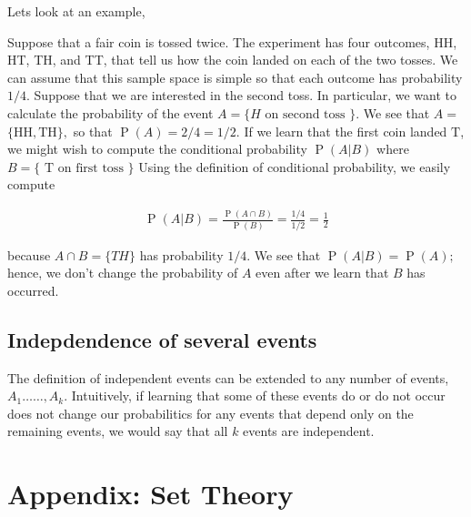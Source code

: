 \documentclass[ 11pt,%
				a4paper,%
				oneside,%
				headinclude,%
				footinclude = true,%
				cleardoublepage = empty,%
				reqno]{scrbook}
\begin{document}
Lets look at an example, 


\begin{example}
	Suppose that a fair coin is tossed twice. The experiment has four outcomes, HH, HT, TH, and TT, that tell us how the coin landed on each of the two tosses. We can assume that this sample space is simple so that each outcome has probability $1 / 4 .$ Suppose that we are interested in the second toss. In particular, we want to calculate the probability of the event $A=\{H \text { on second toss }\}$. We see that $A=$ $\{\mathrm{HH}, \mathrm{TH}\},$ so that $\operatorname{P}(A)=2 / 4=1 / 2 .$ If we learn that the first coin landed $\mathrm{T}$, we might wish to compute the conditional probability $\operatorname{P}(A | B)$ where $B=\{\text { T on first toss }\}$ Using the definition of conditional probability, we easily compute

	\begin{align*}
		\operatorname{P}(A | B)=\frac{\operatorname{P}(A \cap B)}{\operatorname{P}(B)}=\frac{1 / 4}{1 / 2}=\frac{1}{2}
	\end{align*}

	because $A \cap B=\{T H\}$ has probability $1 / 4 .$ We see that $\operatorname{P}(A | B)=\operatorname{P}(A) ;$ hence, we don't change the probability of $A$ even after we learn that $B$ has occurred.
\end{example}



\section{Indepdendence of several events}

The definition of independent events can be extended to any number of events, $A_{1} \ldots \ldots, A_{k} .$ Intuitively, if learning that some of these events do or do not occur does not change our probabilitics for any events that depend only on the remaining events, we would say that all $k$ events are independent.

















\appendix
\chapter{Appendix: Set Theory }
\end{document}
